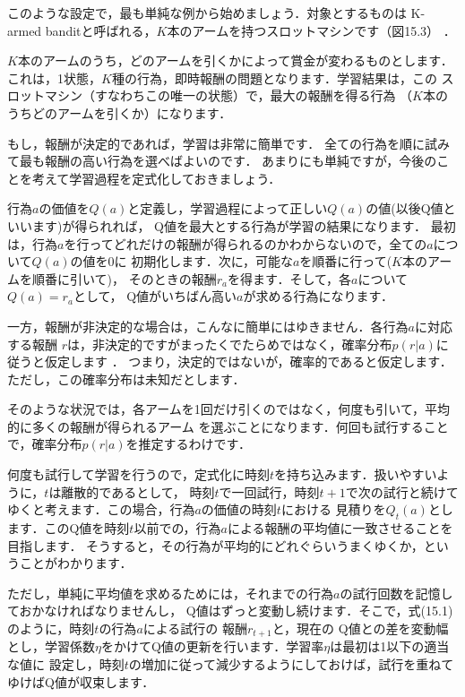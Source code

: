 
このような設定で，最も単純な例から始めましょう．対象とするものは
K-armed banditと呼ばれる，$K$本のアームを持つスロットマシンです（図15.3）
．

$K$本のアームのうち，どのアームを引くかによって賞金が変わるものとします．
これは，1状態，$K$種の行為，即時報酬の問題となります．学習結果は，この
スロットマシン（すなわちこの唯一の状態）で，最大の報酬を得る行為
（$K$本のうちどのアームを引くか）になります．

もし，報酬が決定的であれば，学習は非常に簡単です．
全ての行為を順に試みて最も報酬の高い行為を選べばよいのです．
あまりにも単純ですが，今後のことを考えて学習過程を定式化しておきましょう．

行為$a$の価値を$Q(a)$と定義し，学習過程によって正しい$Q(a)$の値(以後Q値といいます)が得られれば，
Q値を最大とする行為が学習の結果になります．
最初は，行為$a$を行ってどれだけの報酬が得られるのかわからないので，全ての$a$について$Q(a)$の値を0に
初期化します．次に，可能な$a$を順番に行って($K$本のアームを順番に引いて)，
そのときの報酬$r_a$を得ます．そして，各$a$について$Q(a)= r_a$として，
Q値がいちばん高い$a$が求める行為になります．


一方，報酬が非決定的な場合は，こんなに簡単にはゆきません．各行為$a$に対応する報酬
$r$は，非決定的ですがまったくでたらめではなく，確率分布$p(r|a)$に従うと仮定します
．
つまり，決定的ではないが，確率的であると仮定します．ただし，この確率分布は未知だとします．

そのような状況では，各アームを1回だけ引くのではなく，何度も引いて，平均的に多くの報酬が得られるアーム
を選ぶことになります．何回も試行することで，確率分布$p(r|a)$を推定するわけです．

何度も試行して学習を行うので，定式化に時刻$t$を持ち込みます．扱いやすいように，$t$は離散的であるとして，
時刻$t$で一回試行，時刻$t+1$で次の試行と続けてゆくと考えます．この場合，行為$a$の価値の時刻$t$における
見積りを$Q_t(a)$とします．このQ値を時刻$t$以前での，行為$a$による報酬の平均値に一致させることを目指します．
そうすると，その行為が平均的にどれぐらいうまくゆくか，ということがわかります．

ただし，単純に平均値を求めるためには，それまでの行為$a$の試行回数を記憶しておかなければなりませんし，
Q値はずっと変動し続けます．そこで，式(15.1)のように，時刻$t$の行為$a$による試行の
報酬$r_{t+1}$と，現在の
Q値との差を変動幅とし，学習係数$\eta$をかけてQ値の更新を行います．学習率$\eta$は最初は1以下の適当な値に
設定し，時刻$t$の増加に従って減少するようにしておけば，試行を重ねてゆけばQ値が収束します．

